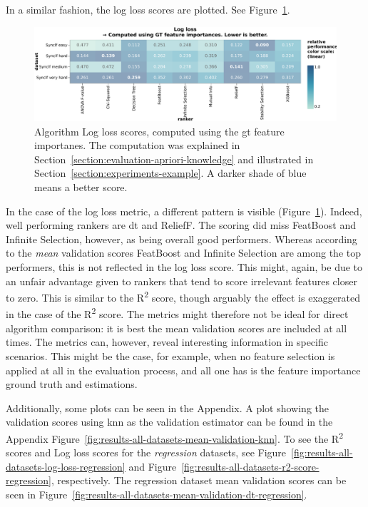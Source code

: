 \documentclass[../main.tex]{subfiles}
\begin{document}
In a similar fashion, the log loss scores are plotted. See Figure~\ref{fig:results-all-datasets-log-loss}.

\begin{figure}[ht]
    \centering
    \includegraphics[width=\linewidth]{report/images/results-all-datasets-log-loss.pdf}
    \caption{Algorithm Log loss scores, computed using the \gls{gt} feature importanes. The computation was explained in Section~\ref{section:evaluation-apriori-knowledge} and illustrated in Section~\ref{section:experiments-example}. A darker shade of blue means a better score.}
    \label{fig:results-all-datasets-log-loss}
\end{figure}

In the case of the log loss metric, a different pattern is visible (Figure~\ref{fig:results-all-datasets-log-loss}). Indeed, well performing rankers are \gls{dt} and ReliefF. The scoring did miss FeatBoost and Infinite Selection, however, as being overall good performers. Whereas according to the \textit{mean} validation scores FeatBoost and Infinite Selection are among the top performers, this is not reflected in the log loss score. This might, again, be due to an unfair advantage given to rankers that tend to score irrelevant features closer to zero. This is similar to the R\textsuperscript{2} score, though arguably the effect is exaggerated in the case of the R\textsuperscript{2} score. The metrics might therefore not be ideal for direct algorithm comparison: it is best the mean validation scores are included at all times. The metrics can, however, reveal interesting information in specific scenarios. This might be the case, for example, when no feature selection is applied at all in the evaluation process, and all one has is the feature importance ground truth and estimations.

Additionally, some plots can be seen in the Appendix. A plot showing the validation scores using \gls{knn} as the validation estimator can be found in the Appendix Figure~\ref{fig:results-all-datasets-mean-validation-knn}. To see the R\textsuperscript{2} scores and Log loss scores for the \textit{regression} datasets, see Figure~\ref{fig:results-all-datasets-log-loss-regression} and Figure~\ref{fig:results-all-datasets-r2-score-regression}, respectively. The regression dataset mean validation scores can be seen in Figure~\ref{fig:results-all-datasets-mean-validation-dt-regression}.
\end{document}
